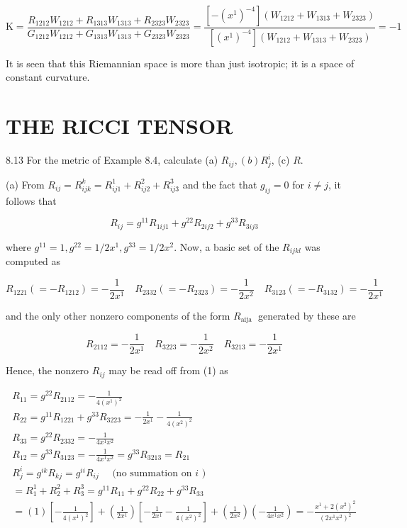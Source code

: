 \documentclass[10pt]{article}
\begin{document}
$$
\mathrm{K}=\frac{R_{1212} W_{1212}+R_{1313} W_{1313}+R_{2323} W_{2323}}{G_{1212} W_{1212}+G_{1313} W_{1313}+G_{2323} W_{2323}}=\frac{\left[-\left(x^{1}\right)^{-4}\right]\left(W_{1212}+W_{1313}+W_{2323}\right)}{\left[\left(x^{1}\right)^{-4}\right]\left(W_{1212}+W_{1313}+W_{2323}\right)}=-1
$$

It is seen that this Riemannian space is more than just isotropic; it is a space of constant curvature.

\section*{THE RICCI TENSOR}
8.13 For the metric of Example 8.4, calculate (a) $R_{i j},(b) R_{j}^{i}$, (c) $R$.

(a) From $R_{i j}=R_{i j k}^{k}=R_{i j 1}^{1}+R_{i j 2}^{2}+R_{i j 3}^{3}$ and the fact that $g_{i j}=0$ for $i \neq j$, it follows that


\begin{equation*}
R_{i j}=g^{11} R_{1 i j 1}+g^{22} R_{2 i j 2}+g^{33} R_{3 i j 3} \tag{1}
\end{equation*}


where $g^{11}=1, g^{22}=1 / 2 x^{1}, g^{33}=1 / 2 x^{2}$. Now, a basic set of the $R_{i j k l}$ was computed as

$$
R_{1221}\left(=-R_{1212}\right)=-\frac{1}{2 x^{1}} \quad R_{2332}\left(=-R_{2323}\right)=-\frac{1}{2 x^{2}} \quad R_{3123}\left(=-R_{3132}\right)=-\frac{1}{2 x^{1}}
$$

and the only other nonzero components of the form $R_{\text {aija }}$ generated by these are

$$
R_{2112}=-\frac{1}{2 x^{1}} \quad R_{3223}=-\frac{1}{2 x^{2}} \quad R_{3213}=-\frac{1}{2 x^{1}}
$$

Hence, the nonzero $R_{i j}$ may be read off from (1) as


\begin{gather*}
R_{11}=g^{22} R_{2112}=-\frac{1}{4\left(x^{1}\right)^{2}} \\
R_{22}=g^{11} R_{1221}+g^{33} R_{3223}=-\frac{1}{2 x^{1}}-\frac{1}{4\left(x^{2}\right)^{2}} \\
R_{33}=g^{22} R_{2332}=-\frac{1}{4 x^{1} x^{2}} \\
R_{12}=g^{33} R_{3123}=-\frac{1}{4 x^{1} x^{2}}=g^{33} R_{3213}=R_{21} \\
R_{j}^{i}=g^{i k} R_{k j}=g^{i i} R_{i j} \quad \text { (no summation on } i \text { ) }  \tag{b}\\
=R_{1}^{1}+R_{2}^{2}+R_{3}^{3}=g^{11} R_{11}+g^{22} R_{22}+g^{33} R_{33} \\
=(1)\left[-\frac{1}{4\left(x^{1}\right)^{2}}\right]+\left(\frac{1}{2 x^{1}}\right)\left[-\frac{1}{2 x^{1}}-\frac{1}{4\left(x^{2}\right)^{2}}\right]+\left(\frac{1}{2 x^{2}}\right)\left(-\frac{1}{4 x^{1} x^{2}}\right)=-\frac{x^{1}+2\left(x^{2}\right)^{2}}{\left(2 x^{1} x^{2}\right)^{2}}
\end{gather*}
\end{document}
